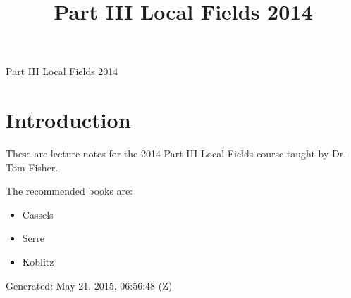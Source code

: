 \documentclass[10pt,]{book}
\title{Part III Local Fields 2014}
\author{}
\date{}
\theoremstyle{plain}
\theoremstyle{definition}
\begin{document}
\frontmatter
\thispagestyle{empty}
\begin{center}
{\Huge Part III Local Fields 2014}
\end{center}\par
{}
\clearpage
\thispagestyle{empty}
\clearpage
\maketitle
\clearpage
\thispagestyle{empty}
\clearpage
\setcounter{tocdepth}{1}
\renewcommand*\contentsname{Contents}
\tableofcontents
\mainmatter
\typeout{************************************************}
\typeout{************************************************}
\chapter[Introduction]{Introduction}\label{chap-introduction}
These are lecture notes for the 2014 Part III Local Fields course taught by Dr. Tom Fisher.%
\par
The recommended books are:
        \begin{itemize}
\item{}Cassels\item{}Serre\item{}Koblitz\end{itemize}

\par
Generated: May 21, 2015, 06:56:48 (Z)%
\typeout{************************************************}
\typeout{************************************************}
\end{document}
